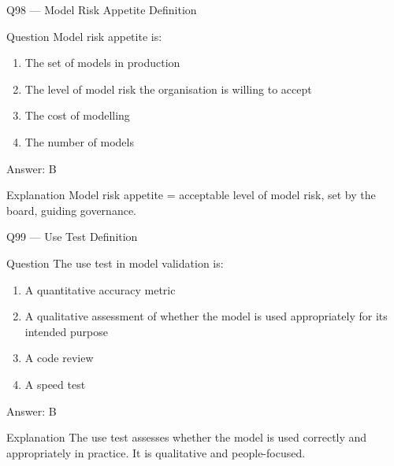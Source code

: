 \documentclass[aspectratio=169,8pt]{beamer}
\begin{document}
	\begin{frame}{Q98 --- Model Risk Appetite Definition}
		\begin{block}{Question}
			Model risk appetite is:
			\begin{enumerate}
				\item The set of models in production
				\item The level of model risk the organisation is willing to accept
				\item The cost of modelling
				\item The number of models
			\end{enumerate}
		\end{block}
		\begin{exampleblock}{Answer: B}\end{exampleblock}
		\begin{block}{Explanation}
			Model risk appetite = acceptable level of model risk, set by the board, guiding governance.
		\end{block}
	\end{frame}
	
	\begin{frame}{Q99 --- Use Test Definition}
		\begin{block}{Question}
			The use test in model validation is:
			\begin{enumerate}
				\item A quantitative accuracy metric
				\item A qualitative assessment of whether the model is used appropriately for its intended purpose
				\item A code review
				\item A speed test
			\end{enumerate}
		\end{block}
		\begin{exampleblock}{Answer: B}\end{exampleblock}
		\begin{block}{Explanation}
			The use test assesses whether the model is used correctly and appropriately in practice. It is qualitative and people-focused.
		\end{block}
	\end{frame}
	
\end{document}
